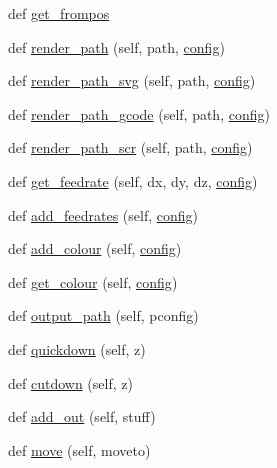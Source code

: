 \begin{DoxyCompactItemize}
\item 
def \hyperlink{classpath_1_1_path_aa281581a5d6bd9b65b1ad365c44df1ff}{get\+\_\+frompos}
\item 
def \hyperlink{classpath_1_1_path_a5c4f41597db3791ad2e3f2a1d2b4e559}{render\+\_\+path} (self, path, \hyperlink{classpath_1_1_path_a889e352f02dba833077975ce855276ed}{config})
\item 
def \hyperlink{classpath_1_1_path_a0e1797ce469f06b794c78c35f8dc3578}{render\+\_\+path\+\_\+svg} (self, path, \hyperlink{classpath_1_1_path_a889e352f02dba833077975ce855276ed}{config})
\item 
def \hyperlink{classpath_1_1_path_abfa95d624558761384779e535352e6b1}{render\+\_\+path\+\_\+gcode} (self, path, \hyperlink{classpath_1_1_path_a889e352f02dba833077975ce855276ed}{config})
\item 
def \hyperlink{classpath_1_1_path_ab1571d434b945b6fee19b16c9154ca1f}{render\+\_\+path\+\_\+scr} (self, path, \hyperlink{classpath_1_1_path_a889e352f02dba833077975ce855276ed}{config})
\item 
def \hyperlink{classpath_1_1_path_aa28b6ee0117dc6e248125dc8e8d73194}{get\+\_\+feedrate} (self, dx, dy, dz, \hyperlink{classpath_1_1_path_a889e352f02dba833077975ce855276ed}{config})
\item 
def \hyperlink{classpath_1_1_path_aacea846261d61c97b97793ccb01da15c}{add\+\_\+feedrates} (self, \hyperlink{classpath_1_1_path_a889e352f02dba833077975ce855276ed}{config})
\item 
def \hyperlink{classpath_1_1_path_af29c03b2fee696e2e8108b3fb1dee9cf}{add\+\_\+colour} (self, \hyperlink{classpath_1_1_path_a889e352f02dba833077975ce855276ed}{config})
\item 
def \hyperlink{classpath_1_1_path_aff9b72c643f93279713370a65896e4f3}{get\+\_\+colour} (self, \hyperlink{classpath_1_1_path_a889e352f02dba833077975ce855276ed}{config})
\item 
def \hyperlink{classpath_1_1_path_a788ae5638ea4240ebc236cc405c04952}{output\+\_\+path} (self, pconfig)
\item 
def \hyperlink{classpath_1_1_path_a1f80a16e3ca69cb2fbeff18fafa4f389}{quickdown} (self, z)
\item 
def \hyperlink{classpath_1_1_path_a27d1699ec110e1f4b987f3df70cdf7a9}{cutdown} (self, z)
\item 
def \hyperlink{classpath_1_1_path_a999ed74b0c314e45cd48a6f22b8f2992}{add\+\_\+out} (self, stuff)
\item 
def \hyperlink{classpath_1_1_path_a3c1eee94a367757ef583fc5a23e9b14f}{move} (self, moveto)

\end{DoxyCompactItemize}
